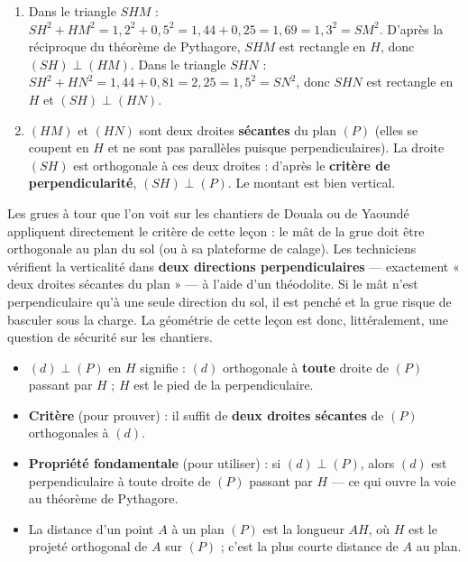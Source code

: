 \documentclass[11pt]{article}
\newcommand{\cle}[1]{{\popxbold\color{popdark}#1}}
\begin{document}
\begin{corrige}[Exercice 1]
\begin{enumerate}
\item Dans le triangle $SHM$ : $SH^2 + HM^2 = 1{,}2^2 + 0{,}5^2 = 1{,}44 + 0{,}25 = 1{,}69 = 1{,}3^2 = SM^2$. D'après la réciproque du théorème de Pythagore, $SHM$ est rectangle en $H$, donc $(SH) \perp (HM)$.
Dans le triangle $SHN$ : $SH^2 + HN^2 = 1{,}44 + 0{,}81 = 2{,}25 = 1{,}5^2 = SN^2$, donc $SHN$ est rectangle en $H$ et $(SH) \perp (HN)$.
\item $(HM)$ et $(HN)$ sont deux droites \textbf{sécantes} du plan $(P)$ (elles se coupent en $H$ et ne sont pas parallèles puisque perpendiculaires). La droite $(SH)$ est orthogonale à ces deux droites : d'après le \textbf{critère de perpendicularité}, $(SH) \perp (P)$. Le montant est bien vertical.
\end{enumerate}
\end{corrige}

\begin{savaistu}
Les grues à tour que l'on voit sur les chantiers de Douala ou de Yaoundé appliquent directement le critère de cette leçon : le mât de la grue doit être orthogonale au plan du sol (ou à sa plateforme de calage). Les techniciens vérifient la verticalité dans \textbf{deux directions perpendiculaires} — exactement « deux droites sécantes du plan » — à l'aide d'un théodolite. Si le mât n'est perpendiculaire qu'à une seule direction du sol, il est penché et la grue risque de basculer sous la charge. La géométrie de cette leçon est donc, littéralement, une question de sécurité sur les chantiers.
\end{savaistu}

\begin{aretenir}
\begin{itemize}
\item $(d) \perp (P)$ en $H$ signifie : $(d)$ orthogonale à \textbf{toute} droite de $(P)$ passant par $H$ ; $H$ est le \cle{pied de la perpendiculaire}.
\item \textbf{Critère} (pour prouver) : il suffit de \textbf{deux droites sécantes} de $(P)$ orthogonales à $(d)$.
\item \textbf{Propriété fondamentale} (pour utiliser) : si $(d) \perp (P)$, alors $(d)$ est perpendiculaire à toute droite de $(P)$ passant par $H$ — ce qui ouvre la voie au théorème de Pythagore.
\item La \cle{distance} d'un point $A$ à un plan $(P)$ est la longueur $AH$, où $H$ est le projeté orthogonal de $A$ sur $(P)$ ; c'est la plus courte distance de $A$ au plan.
\end{itemize}
\end{aretenir}
\end{document}

